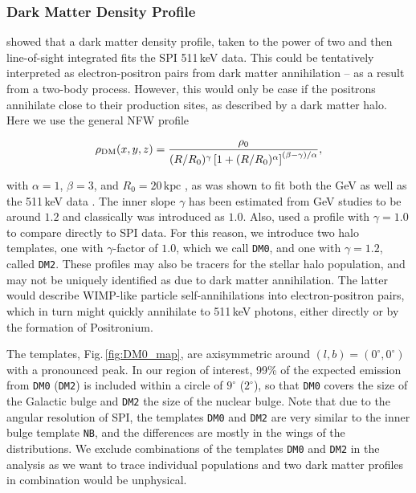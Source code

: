 \documentclass[doublespace,nopageskip]{VTthesis} %
\newcommand{\mrm}[1]{\mathrm{#1}}
\begin{document}
\subsubsection{Dark Matter Density Profile}

\citet{Skinner2014_511} showed that a dark matter density profile, taken to the power of two and then line-of-sight integrated fits the SPI 511\,keV data.
%
This could be tentatively interpreted as electron-positron pairs from dark matter annihilation -- as a result from a two-body process.
%
However, this would only be case if the positrons annihilate close to their production sites, as described by a dark matter halo.
%
Here we use the general NFW profile \citep{1997ApJ...490..493N}

\begin{equation}
	\rho_{\rm DM}(x,y,z) = \frac{\rho_0}{(R/R_0)^{\gamma}\left[1+(R/R_0)^{\alpha}\right]^{(\beta-\gamma)/\alpha}}\mrm{,}
	\label{eq:NFW_profile}
\end{equation}

\noindent with $\alpha=1$, $\beta=3$, and $R_0=20\,\mrm{kpc}$ \citep{2014PhRvD..90b3526A}, as was shown to fit both the GeV \citep{2011PhRvD..84l3005H,2014PhRvD..90b3526A,2016PDU....12....1D} as well as the 511\,keV data \citep{2012JCAP...04..022V,Skinner2014_511}.
%
The inner slope $\gamma$ has been estimated from GeV studies to be around $1.2$ and classically was introduced as $1.0$.
%
Also, \citet{Skinner2014_511} used a profile with $\gamma=1.0$ to compare directly to SPI data.
%
For this reason, we introduce two halo templates, one with $\gamma$-factor of $1.0$, which we call \texttt{DM0}, and one with $\gamma=1.2$, called \texttt{DM2}.
%
These profiles may also be tracers for the stellar halo population, and may not be uniquely identified as due to dark matter annihilation.
%
The latter would describe WIMP-like particle self-annihilations into electron-positron pairs, which in turn might quickly annihilate to 511\,keV photons, either directly or by the formation of Positronium.

The templates, Fig.\,\ref{fig:DM0_map}, are axisymmetric around $(l,b)=(0^{\circ},0^{\circ})$ with a pronounced peak.
%
In our region of interest, 99\% of the expected emission from \texttt{DM0} (\texttt{DM2}) is included within a circle of $9^{\circ}$ ($2^{\circ}$), so that \texttt{DM0} covers the size of the Galactic bulge and \texttt{DM2} the size of the nuclear bulge.
%
Note that due to the angular resolution of SPI, the templates \texttt{DM0} and \texttt{DM2} are very similar to the inner bulge template \texttt{NB}, and the differences are mostly in the wings of the distributions.
%
We exclude combinations of the templates \texttt{DM0} and \texttt{DM2} in the analysis as we want to trace individual populations and two dark matter profiles in combination would be unphysical.
\end{document}
